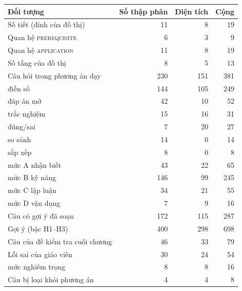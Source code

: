\small
\begin{tabular}{@{}>{\raggedright\arraybackslash}p{3.4cm}rrr@{}}
\toprule
Đối tượng & Số thập phân & Diện tích & Cộng \\
\midrule
Số tiết (đỉnh của đồ thị) & 11 & 8 & 19 \\
Quan hệ \textsc{prerequisite} & 6 & 3 & 9 \\
Quan hệ \textsc{application} & 11 & 8 & 19 \\
Số tầng của đồ thị & 8 & 5 & 13 \\
\midrule
Câu hỏi trong phương án dạy & 230 & 151 & 381 \\
\quad điền số & 144 & 105 & 249 \\
\quad đáp án mở & 42 & 10 & 52 \\
\quad trắc nghiệm & 15 & 16 & 31 \\
\quad đúng/sai & 7 & 20 & 27 \\
\quad so sánh & 14 & 0 & 14 \\
\quad sắp xếp & 8 & 0 & 8 \\
\midrule
\quad mức A nhận biết & 43 & 22 & 65 \\
\quad mức B kỹ năng & 146 & 99 & 245 \\
\quad mức C lập luận & 34 & 21 & 55 \\
\quad mức D vận dụng & 7 & 9 & 16 \\
\midrule
Câu có gợi ý đã soạn & 172 & 115 & 287 \\
Gợi ý (bậc H1--H3) & 400 & 298 & 698 \\
Câu của đề kiểm tra cuối chương & 46 & 33 & 79 \\
\midrule
Lỗi sai của giáo viên & 30 & 24 & 54 \\
\quad mức nghiêm trọng & 8 & 8 & 16 \\
Câu bị loại khỏi phương án & 4 & 4 & 8 \\
\bottomrule
\end{tabular}
